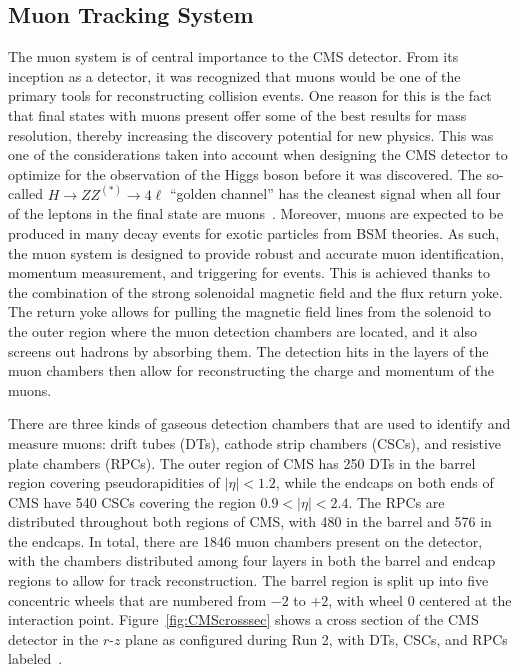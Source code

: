 \subsection{Muon Tracking System}
\label{subsec:muonTrack}

The muon system is of central importance to the CMS detector.
From its inception as a detector, it was recognized that muons would be one of the primary tools for reconstructing collision events.
One reason for this is the fact that final states with muons present offer some of the best results for mass resolution, thereby increasing the discovery potential for new physics.
This was one of the considerations taken into account when designing the CMS detector to optimize for the observation of the Higgs boson before it was discovered.
The so-called $H\to ZZ^{(*)}\to 4\ell$ ``golden channel'' has the cleanest signal when all four of the leptons in the final state are muons~\cite{Gainer_2011}.
Moreover, muons are expected to be produced in many decay events for exotic particles from BSM theories.
As such, the muon system is designed to provide robust and accurate muon identification, momentum measurement, and triggering for events.
This is achieved thanks to the combination of the strong solenoidal magnetic field and the flux return yoke.
The return yoke allows for pulling the magnetic field lines from the solenoid to the outer region where the muon detection chambers are located, and it also screens out hadrons by absorbing them.
The detection hits in the layers of the muon chambers then allow for reconstructing the charge and momentum of the muons.

There are three kinds of gaseous detection chambers that are used to identify and measure muons: drift tubes (DTs), cathode strip chambers (CSCs), and resistive plate chambers (RPCs).
The outer region of CMS has 250 DTs in the barrel region covering pseudorapidities of $|\eta|<1.2$, while the endcaps on both ends of CMS have 540 CSCs covering the region $0.9<|\eta|<2.4$.
The RPCs are distributed throughout both regions of CMS, with 480 in the barrel and 576 in the endcaps.
In total, there are 1846 muon chambers present on the detector, with the chambers distributed among four layers in both the barrel and endcap regions to allow for track reconstruction. %
The barrel region is split up into five concentric wheels that are numbered from $-2$ to $+2$, with wheel 0 centered at the interaction point.
Figure~\ref{fig:CMScrosssec} shows a cross section of the CMS detector in the $r$-$z$ plane as configured during Run 2, with DTs, CSCs, and RPCs labeled~\cite{Sirunyan_2018_CMS}.


